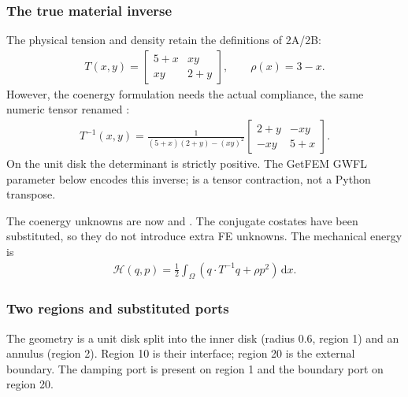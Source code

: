 \documentclass[letterpaper,10pt,english]{sphinxmanual}
\begin{document}
\subsubsection{The true material inverse}
\label{\detokenize{examples/wave_coenergy:the-true-material-inverse}}
\sphinxAtStartPar
The physical tension and density retain the definitions of 2A/2B:
\begin{equation*}
\begin{split}T(x,y)=\begin{bmatrix}5+x&xy\\xy&2+y\end{bmatrix},
\qquad \rho(x)=3-x.\end{split}
\end{equation*}
\sphinxAtStartPar
However, the co\sphinxhyphen{}energy formulation needs the actual compliance,
 the same numeric tensor renamed :
\begin{equation*}
\begin{split}T^{-1}(x,y)=\frac{1}{(5+x)(2+y)-(xy)^2}
\begin{bmatrix}2+y&-xy\\-xy&5+x\end{bmatrix}.\end{split}
\end{equation*}
\sphinxAtStartPar
On the unit disk the determinant is strictly positive. The
GetFEM GWFL parameter  below encodes this inverse;
 is a tensor contraction, not a Python transpose.

\sphinxAtStartPar
The co\sphinxhyphen{}energy unknowns are now  
and  . The conjugate co\sphinxhyphen{}states have
been substituted, so they do not introduce extra FE unknowns.
The mechanical energy is
\begin{equation*}
\begin{split}\mathcal H(q,p)=\frac12\int_\Omega
\left(q\cdot T^{-1}q+\rho p^2\right)\,\mathrm dx.\end{split}
\end{equation*}

\subsubsection{Two regions and substituted ports}
\label{\detokenize{examples/wave_coenergy:two-regions-and-substituted-ports}}
\sphinxAtStartPar
The geometry is a unit disk split into the inner disk
 (radius 0.6, region 1) and an annulus
 (region 2). Region 10 is their interface;
region 20 is the external boundary. The damping port
is present  on region 1 and the boundary port
 on region 20.
\end{document}

